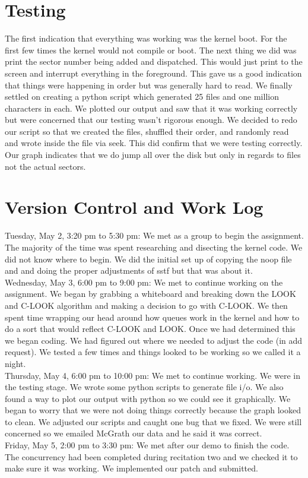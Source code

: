 \documentclass[letterpaper,10pt,serif,draftclsnofoot,onecolumn,compsoc,titlepage]{IEEEtran}
\begin{document}
\section{Testing}
The first indication that everything was working was the kernel boot. For 
the first few times the kernel would not compile or boot. The next thing 
we did was print the sector number being added and dispatched. This would 
just print to the screen and interrupt everything in the foreground. 
This gave us a good indication that things were happening in order but 
was generally hard to read. We finally settled on creating a python 
script which generated 25 files and one million characters in 
each. We plotted our output and saw that it was working correctly but were 
concerned that our testing wasn't rigorous enough. We decided to redo our 
script so that we created the files, shuffled their order, and randomly 
read and wrote inside the file via seek. This did confirm that we were 
testing correctly. Our graph indicates that we do jump all over the disk 
but only in regards to files not the actual sectors.   
\section{Version Control and Work Log}
Tuesday, May 2, 3:20 pm to 5:30 pm: We met as a group to begin the 
assignment. The majority of the time was spent researching and disecting
the kernel code. We did not know where to begin. We did the initial set up 
of copying the noop file and and doing the proper adjustments of sstf but 
that was about it. \\
Wednesday, May 3, 6:00 pm to 9:00 pm: We met to continue working on 
the assignment. We began by grabbing a whiteboard and breaking down the 
LOOK and C-LOOK algorithm and making a decision to go with C-LOOK. We 
then spent time wrapping our head around how queues work in the kernel 
and how to do a sort that would reflect C-LOOK and LOOK. Once we had 
determined this we began coding. We had figured out where we needed to 
adjust the code (in add request). We tested a few times and things looked 
to be working so we called it a night. \\
Thursday, May 4, 6:00 pm to 10:00 pm: We met to continue working. We were 
in the testing stage. We wrote some python scripts to generate file i/o. 
We also found a way to plot our output with python so we could see it 
graphically. We began to worry that we were not doing things correctly 
because the graph looked to clean. We adjusted our scripts and caught 
one bug that we fixed. We were still concerned so we emailed McGrath our 
data and he said it was correct.\\
Friday, May 5, 2:00 pm to 3:30 pm: We met after our demo to finish the 
code. The concurrency had been completed during recitation two and we
 checked it to make sure it was working. We implemented our patch
  and submitted. \\ 
\newpage
\end{document}
